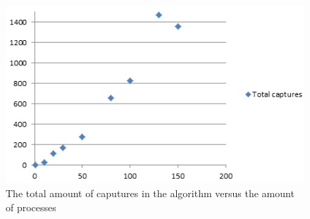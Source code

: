 \documentclass[12pt]{article}
\begin{document}
\begin{figure}[p]
    \centering
    \includegraphics{totalcapture.png}
    \caption{The total amount of caputures in the algorithm versus the amount of processes}
    \label{fig:captures}
\end{figure}
\end{document}
